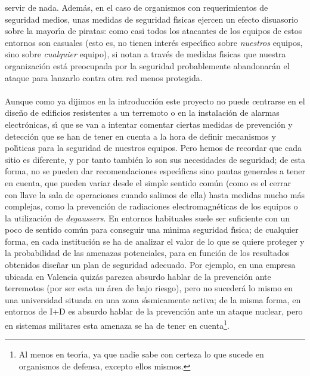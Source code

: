 servir de nada. Adem\'as, en el caso de organismos con requerimientos de 
seguridad medios, unas medidas de seguridad f\'{\i}sicas ejercen un efecto 
disuasorio sobre la mayor\'{\i}a de piratas: como casi todos los atacantes de 
los equipos de estos entornos son casuales (esto
es, no tienen inter\'es espec\'{\i}fico sobre {\it nuestros} equipos, sino sobre
{\it cualquier} equipo), si notan a trav\'es de medidas f\'{\i}sicas que 
nuestra organizaci\'on est\'a preocupada por la seguridad probablemente 
abandonar\'an el ataque para lanzarlo contra otra red menos protegida.\\
\\Aunque como ya dijimos en la introducci\'on este proyecto no puede 
centrarse en el dise\~no de edificios resistentes a un terremoto o en la 
instalaci\'on de alarmas electr\'onicas, s\'{\i} que se van a intentar comentar
ciertas medidas de prevenci\'on y detecci\'on que se han de tener en cuenta a
la hora de definir mecanismos y pol\'{\i}ticas para la seguridad de nuestros
equipos. Pero hemos de recordar que cada sitio es diferente, y por tanto 
tambi\'en lo son sus necesidades de seguridad; de esta forma, no se pueden dar 
recomendaciones espec\'{\i}ficas sino pautas generales a tener en cuenta, que
pueden variar desde el simple sentido com\'un (como es el cerrar con llave la
sala de operaciones cuando salimos de ella) hasta medidas mucho m\'as 
complejas, como la prevenci\'on de radiaciones electromagn\'eticas de los
equipos o la utilizaci\'on de {\it degaussers}. En entornos habituales
suele ser suficiente con un poco de sentido com\'un para conseguir una 
m\'{\i}nima seguridad f\'{\i}sica; de cualquier forma, en cada instituci\'on se
ha de analizar el valor de lo que se quiere proteger y la probabilidad de las 
amenazas potenciales, para en funci\'on de los resultados obtenidos dise\~nar
un plan de seguridad adecuado. Por ejemplo, en una empresa ubicada en 
Valencia quiz\'as parezca absurdo hablar de la prevenci\'on ante terremotos
(por ser esta un \'area de bajo riesgo), pero no suceder\'a lo mismo en una
universidad situada en una zona s\'{\i}smicamente activa; de la misma forma, en
entornos de I+D es absurdo hablar de la prevenci\'on ante un ataque nuclear,
pero en sistemas militares esta amenaza se ha de tener en cuenta\footnote{Al 
menos en teor\'{\i}a, ya que nadie sabe con certeza lo que sucede en 
organismos de defensa, excepto ellos mismos.}.
